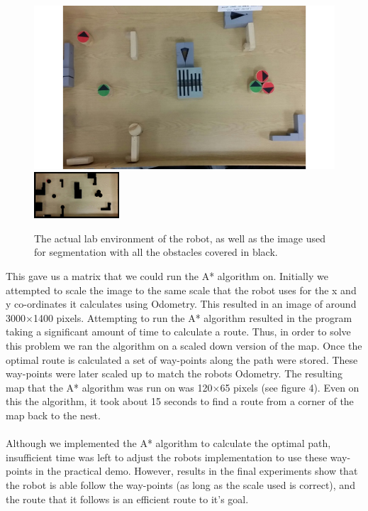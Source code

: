 \documentclass[]{article}
\begin{document}
\begin{figure}[h]
 \includegraphics[scale=0.4]{A_2}
 \includegraphics[scale=2.14]{A_3}
 \centering
 \caption{The actual lab environment of the robot, as well as the image used for segmentation with all the obstacles covered in black.}
\end{figure}
\begin{center} 
\end{center}
This gave us a matrix that we could run the A* algorithm on. Initially we attempted to scale the image to the same scale that the robot uses for the x and y co-ordinates it calculates using Odometry. This resulted in an image of around 3000$\times$1400 pixels. Attempting to run the A* algorithm resulted in the program taking a significant amount of time to calculate a route. Thus, in order to solve this problem we ran the algorithm on a scaled down version of the map. Once the optimal route is calculated a set of way-points along the path were stored. These way-points were later scaled up to match the robots Odometry. The resulting map that the A* algorithm was run on was 120$\times$65 pixels (see figure 4). Even on this the algorithm, it took about 15 seconds to find a route from a corner of the map back to the nest. \\\\
Although we implemented the A* algorithm to calculate the optimal path, insufficient time was left to adjust the robots implementation to use these way-points in the practical demo. However, results in the final experiments show that the robot is able follow the way-points (as long as the scale used is correct), and the route that it follows is an efficient route to it's goal.
\end{document}
